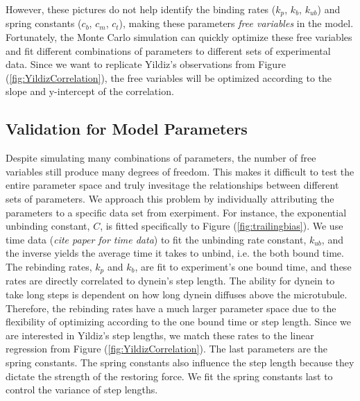 However, these pictures do not help identify the binding rates ($k_p$, $k_b$, $k_{ub}$) and spring constants ($c_b$, $c_m$, $c_t$), making these parameters \textit{free variables} in the model. Fortunately, the Monte Carlo simulation can quickly optimize these free variables and fit different combinations of parameters to  different sets of experimental data. Since we want to replicate Yildiz's observations from Figure (\ref{fig:YildizCorrelation}), the free variables will be optimized according to the slope and y-intercept of the correlation. 

\subsection{Validation for Model Parameters}

Despite simulating many combinations of parameters, the number of free variables still produce many degrees of freedom. This makes it difficult to test the entire parameter space and truly invesitage the relationships between different sets of parameters. We approach this problem by individually attributing the parameters to a specific data set from exerpiment. For instance, the exponential unbinding constant, $C$, is fitted specifically to Figure (\ref{fig:trailingbias}). We use time data (\textit{cite paper for time data}\cite{}) to fit the unbinding rate constant, $k_{ub}$, and the inverse yields the average time it takes to unbind, i.e. the both bound time. The rebinding rates, $k_p$ and $k_b$, are fit to experiment's one bound time, and these rates are directly correlated to dynein's step length. The ability for dynein to take long steps is dependent on how long dynein diffuses above the microtubule. Therefore, the rebinding rates have a much larger parameter space due to the flexibility of optimizing according to the one bound time or step length. Since we are interested in Yildiz's step lengths, we match these rates to the linear regression from Figure (\ref{fig:YildizCorrelation}). The last parameters are the spring constants. The spring constants also influence the step length because they dictate the strength of the restoring force. We fit the spring constants last to control the variance of step lengths.




